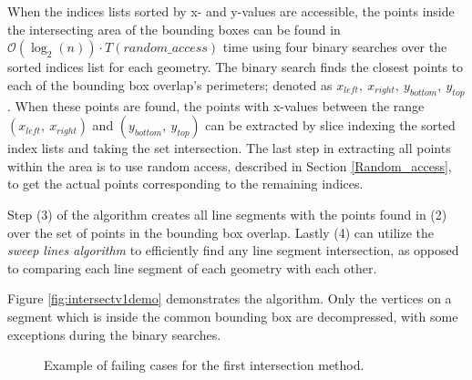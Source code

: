 When the indices lists sorted by x- and y-values are accessible, the points inside the intersecting area of the bounding boxes can be found in $\mathcal{O}(\log_2(n)) \cdot T(random\_access)$ time using four binary searches over the sorted indices list for each geometry. The binary search finds the closest points to each of the bounding box overlap's perimeters; denoted as $x_{left},\ x_{right},\ y_{bottom},\ y_{top}$. When these points are found, the points with x-values between the range $(x_{left},\ x_{right})$ and $(y_{bottom},\ y_{top})$ can be extracted by slice indexing the sorted index lists and taking the set intersection. The last step in extracting all points within the area is to use random access, described in Section \ref{Random_access}, to get the actual points corresponding to the remaining indices.

Step (3) of the algorithm creates all line segments with the points found in (2) over the set of points in the bounding box overlap. Lastly (4) can utilize the \textit{sweep lines algorithm} to efficiently find any line segment intersection, as opposed to comparing each line segment of each geometry with each other.

Figure \ref{fig:intersectv1demo} demonstrates the algorithm. Only the vertices on a segment which is inside the common bounding box are decompressed, with some exceptions during the binary searches.

\begin{figure}[htbp]%
    \centering
    \qquad
    \caption{Example of failing cases for the first intersection method.}%
    \label{fig:bbFail1}%
\end{figure}

